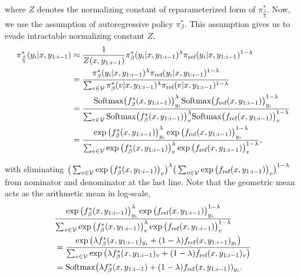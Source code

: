 where $Z$ denotes the normalizing constant of reparameterized form of $\pi^*_\frac{\beta}{\lambda}$. Now, we use the assumption of autoregressive policy $\pi^*_\beta$. This assumption gives us to evade intractable normalizing constant $Z$,
\begin{equation*}
\begin{split}
\pi^*_\frac{\beta}{\lambda} (y_i | x, y_{1:i-1}) &\approx \frac{1}{Z(x, y_{1:i-1})} \pi^*_\beta (y_i | x, y_{1:i-1})^\lambda \pi_{\text{ref}}(y_i | x, y_{1:i-1})^{1-\lambda} \\
&= \frac{\pi^*_\beta (y_i | x, y_{1:i-1})^\lambda \pi_{\text{ref}}(y_i | x, y_{1:i-1})^{1-\lambda}}{\sum_{v \in \mathcal{V}}\pi^*_\beta (v | x, y_{1:i-1})^\lambda \pi_{\text{ref}}(v | x, y_{1:i-1})^{1-\lambda}} \\
&= \frac{\textnormal{Softmax} \big(f^*_\beta (x, y_{1:i-1}) \big)^\lambda_{y_i} \textnormal{Softmax} \big(f_{\textnormal{ref}} (x, y_{1:i-1}) \big)^{1 - \lambda}_{y_i}}{\sum_{v \in \mathcal{V}} \textnormal{Softmax} \big(f^*_\beta (x, y_{1:i-1}) \big)^\lambda_v \textnormal{Softmax} \big(f_{\textnormal{ref}} (x, y_{1:i-1}) \big)^{1 - \lambda}_v} \\
&= \frac{\exp \big(f^*_\beta (x, y_{1:i-1}) \big)^\lambda_{y_i} \exp \big(f_{\textnormal{ref}} (x, y_{1:i-1}) \big)^{1 - \lambda}_{y_i}}{\sum_{v \in \mathcal{V}} \exp \big(f^*_\beta (x, y_{1:i-1}) \big)^\lambda_v \exp \big(f_{\textnormal{ref}} (x, y_{1:i-1}) \big)^{1 - \lambda}_v}, \\
\end{split}
\end{equation*}

with eliminating $ \big( \sum_{v \in \mathcal{V}} \exp \big(f^*_\beta (x, y_{1:i-1}) \big)_v \big)^\lambda \big( \sum_{v \in \mathcal{V}} \exp \big(f_{\textnormal{ref}} (x, y_{1:i-1}) \big)_v \big)^{1 - \lambda} $ from nominator and denominator at the last line. Note that the geometric mean acts as the arithmetic mean in log-scale,
\begin{equation*}
\begin{split}
&\frac{\exp \big(f^*_\beta (x, y_{1:i-1}) \big)^\lambda_{y_i} \exp \big(f_{\textnormal{ref}} (x, y_{1:i-1}) \big)^{1 - \lambda}_{y_i}}{\sum_{v \in \mathcal{V}} \exp \big(f^*_\beta (x, y_{1:i-1}) \big)^\lambda_v \exp \big(f_{\textnormal{ref}} (x, y_{1:i-1}) \big)^{1 - \lambda}_v} \\
&= \frac{\exp \big( \lambda f^*_\beta (x, y_{1:i-1})_{y_i} + (1-\lambda) f_{\textnormal{ref}} (x, y_{1:i-1})_{y_i} \big)}{\sum_{v \in \mathcal{V}} \exp \big( \lambda f^*_\beta (x, y_{1:i-1})_v + (1-\lambda) f_{\textnormal{ref}} (x, y_{1:i-1})_v \big)} \\
&= \textnormal{Softmax} \big(\lambda f^*_\beta (x, y_{1:i-1}) + (1-\lambda) f_{\textnormal{ref}} (x, y_{1:i-1}))_{y_i}. \\
\end{split}
\end{equation*}


